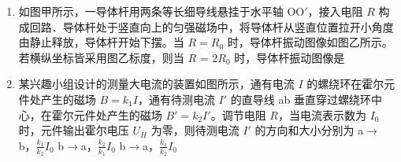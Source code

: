 \documentclass[\gkver]{gaokaozhenti}
\begin{document}
\begin{enumerate}
{A．抵消声波与噪声的振幅相同，也为 $A$，A 错误；

B．抵消声波与噪声的频率相同，由 $f = \frac{1}{T}$ = 100 $\UHz$。B 正确；

C．抵消声波与噪声的波速、频率相同，则波长也相同，为 $\lambda = vT$ = 340$\times$0.01 $\Um$ = 3.4 $\Um$。C 错误；

D．抵消声波在耳膜中产生的振动与图中所示的振动反相，D 错误。

故选 B。
}

\item
如图甲所示，一导体杆用两条等长细导线悬挂于水平轴 OO$'$，接入电阻 $R$ 构成回路．导体杆处于竖直向上的匀强磁场中，将导体杆从竖直位置拉开小角度由静止释放，导体杆开始下摆。当 $R = R_{0}$ 时，导体杆振动图像如图乙所示。若横纵坐标皆采用图乙标度，则当 $R$ = 2$R_{0}$ 时，导体杆振动图像是
{}

\item
某兴趣小组设计的测量大电流的装置如图所示，通有电流 $I$ 的螺绕环在霍尔元件处产生的磁场 $B = k_{1}I$，通有待测电流 $I'$ 的直导线 ab 垂直穿过螺绕环中心，在霍尔元件处产生的磁场 $B' = k_{2}I'$。调节电阻 $R$，当电流表示数为 $I_{0}$ 时，元件输出霍尔电压 $U_{H}$ 为零，则待测电流 $I'$ 的方向和大小分别为
{a$\to$b，$\frac{{{k_1}}}{{{k_2}}}I_{0}$}
{b$\to$a，$\frac{{{k_2}}}{{{k_1}}} I_{0}$}
{b$\to$a，$\frac{{{k_1}}}{{{k_2}}}I_{0}$}
\end{enumerate}
\end{document}
